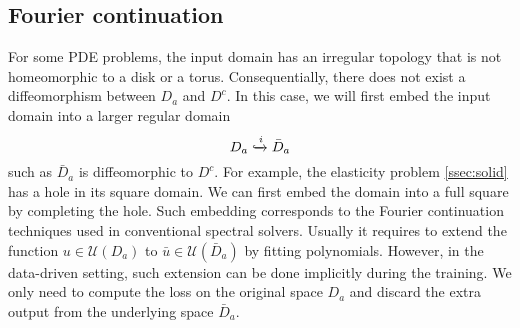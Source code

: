 \documentclass{article}
\newcommand{\cK}{\mathcal{K}}
\newcommand{\cP}{\mathcal{P}}
\newcommand{\cQ}{\mathcal{Q}}
\newcommand{\G}{\mathcal{G}}
\newcommand{\Gtrue}{\mathcal{G}^{\dagger}}
\begin{document}





\subsection{Fourier continuation}
For some PDE problems, the input domain has an irregular topology that is not homeomorphic to a disk or a torus. Consequentially, there does not exist a diffeomorphism between $D_a$ and $D^c$. In this case, we will first embed the input domain into a larger regular domain
\[ D_a \xhookrightarrow{i} \bar{D}_a \]
such as $\bar{D}_a$ is diffeomorphic to $D^c$. For example, the elasticity problem \ref{ssec:solid} has a hole in its square domain. We can first embed the domain into a full square by completing the hole. Such embedding corresponds to the Fourier continuation \citep{bruno2007accurate} techniques used in conventional spectral solvers. Usually it requires to extend the function $u \in \mathcal{U}(D_a)$  to $\bar{u} \in \mathcal{U}(\bar{D}_a)$ by fitting polynomials. However, in the data-driven setting, such extension can be done implicitly during the training. We only need to compute the loss on the original space $D_a$ and discard the extra output from the underlying space $\bar{D}_a$.





\end{document}
